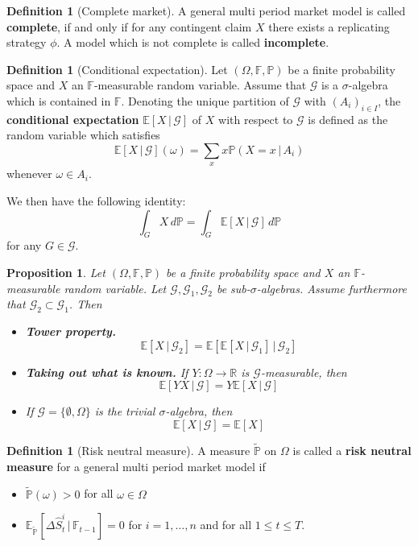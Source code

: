 \documentclass[10pt, oneside, reqno]{amsart}
\theoremstyle{plain}%
\newtheorem{prop}[thm]{Proposition}
\theoremstyle{definition}
\newtheorem{defn}[thm]{Definition}
\theoremstyle{remark}
\newcommand{\expc}[1]{\mathbb{E}\left[#1\right]}
\newcommand{\expp}[1]{\mathbb{E}_{\rnm}\left[#1\right]}
\newcommand{\prob}[1]{\mathbb{P}(#1)}
\newcommand{\given}{ \, | \,}
\newcommand{\R}{\mathbb{R}}
\newcommand{\F}{\mathbb{F}}
\newcommand{\rnm}{\tilde{\mathbb{P}}}
\begin{document}
\begin{defn}[Complete market] 
    A general multi period market model is called \textbf{complete}, if and only if for any contingent claim $X$ there exists a replicating strategy $\phi$.  A model which is not complete is called \textbf{incomplete}.  
\end{defn}

\begin{defn}[Conditional expectation]
    Let $(\Omega, \F, \mathbb{P})$ be a finite probability space and $X$ an $\F$-measurable random variable.  Assume that $\mathcal{G}$ is a $\sigma$-algebra which is contained in $\F$.  Denoting the unique partition of $\mathcal{G}$ with $(A_i)_{i \in I}$, the \textbf{conditional expectation} $\expc{X \given \mathcal{G}}$ of $X$ with respect to $\mathcal{G}$ is defined as the random variable which satisfies \[
        \expc{X \given \mathcal{G}}(\omega) = \sum_{x} x \prob{X = x \given A_i}
    \] whenever $\omega \in A_i$. 
    
    We then have the following identity: \[
        \int_G X \, d\mathbb{P} = \int_G \expc{X \given \mathcal{G}} \, d \mathbb{P}
    \] for any $G \in \mathcal{G}$.
\end{defn}

\begin{prop}
Let $(\Omega, \F, \mathbb{P})$ be a finite probability space and $X$ an $\F$-measurable random variable.  Let $\mathcal{G},\mathcal{G}_1,\mathcal{G}_2$ be sub-$\sigma$-algebras.  Assume furthermore that $\mathcal{G}_2 \subset \mathcal{G}_1$.  Then
\begin{itemize}
    \item \textbf{Tower property.}\[
        \expc{X \given \mathcal{G}_2} = \expc{\expc{X \given \mathcal{G}_1} \given \mathcal{G}_2}
    \]
    \item \textbf{Taking out what is known.}  If $Y:\Omega \rightarrow \R$ is $\mathcal{G}$-measurable, then \[
        \expc{YX \given \mathcal{G}} = Y \expc{X \given \mathcal{G}}
    \]
    \item If $\mathcal{G} = \{ \emptyset, \Omega \}$ is the trivial $\sigma$-algebra, then \[
        \expc{X \given \mathcal{G}} = \expc{X}
    \]
\end{itemize}
\end{prop}


\begin{defn}[Risk neutral measure]
    A measure $\rnm$ on $\Omega$ is called a \textbf{risk neutral measure} for a general multi period market model if 
    \begin{itemize}
        \item $\rnm(\omega) > 0$ for all $\omega \in \Omega$
        \item $\expp{\Delta \hat{S}^i_t \given \F_{t-1}} = 0$ for $i = 1,\dots,n$ and for all $1 \leq t \leq T$.
    \end{itemize}
\end{defn}
\end{document}
